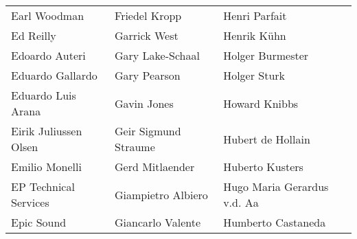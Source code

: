 \begin{tabular}{p{4.5cm}p{4.5cm}p{4.5cm}}
Earl Woodman & Friedel Kropp & Henri Parfait \\
Ed Reilly & Garrick West & Henrik Kühn \\
Edoardo Auteri & Gary Lake-Schaal & Holger Burmester \\
Eduardo Gallardo & Gary Pearson & Holger Sturk \\
Eduardo Luis Arana & Gavin Jones & Howard Knibbs \\
Eirik Juliussen Olsen & Geir Sigmund Straume & Hubert de Hollain \\
Emilio Monelli & Gerd Mitlaender & Huberto Kusters \\
EP Technical Services & Giampietro Albiero & Hugo Maria Gerardus v.d. Aa \\
Epic Sound & Giancarlo Valente & Humberto Castaneda \\
\end{tabular}
\newpage
\setlength{\tabcolsep}{1mm}
